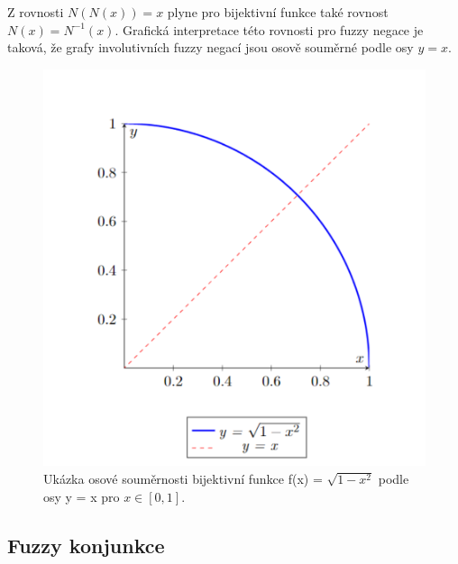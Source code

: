     \begin{remark}
        Z rovnosti $N(N(x))=x$ plyne pro bijektivn\'i funkce tak\'e rovnost $N(x)= N^{-1}(x).$ 
         Grafick\'a interpretace  t\'eto rovnosti  pro fuzzy negace je taková, že grafy involutivních fuzzy negací jsou osově souměrné podle osy $y = x$.

    \begin{figure}[h]
            \caption{ Ukázka osové souměrnosti bijektivní funkce f(x) = $\sqrt{1-x^2}$ podle osy y = x pro $x \in [0,1]$.\\}
                \hspace{-1cm}
                \includegraphics[scale=0.65]{template-fig/soumernost.pdf}
                \centering
    \end{figure}

    \end{remark}


    
\subsection{Fuzzy konjunkce}

